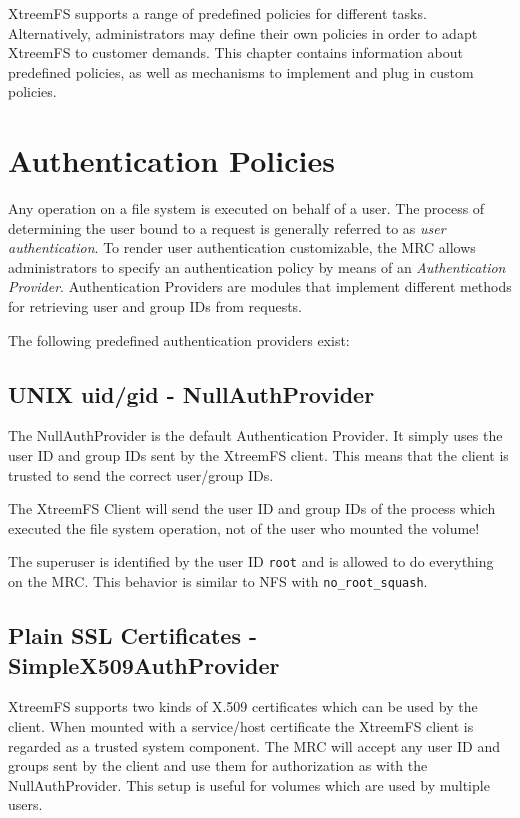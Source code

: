 \documentclass[a4paper,10pt]{book}
\begin{document}
XtreemFS supports a range of predefined policies for different tasks. Alternatively, administrators may define their own policies in order to adapt XtreemFS to customer demands. This chapter contains information about predefined policies, as well as mechanisms to implement and plug in custom policies.

\section{Authentication Policies} \label{sec:authentication_policies}
Any operation on a file system is executed on behalf of a user. The process of determining the user bound to a request is generally referred to as \emph{user authentication}. To render user authentication customizable, the MRC allows administrators to specify an authentication policy by means of an \emph{Authentication Provider}. Authentication Providers are modules that implement different methods for retrieving user and group IDs from requests.

The following predefined authentication providers exist:

\subsection{UNIX uid/gid - NullAuthProvider}

The NullAuthProvider is the default Authentication Provider. It simply uses the user ID and group IDs sent by the XtreemFS client. This means that the client is trusted to send the correct user/group IDs.

The XtreemFS Client will send the user ID and group IDs of the process which executed the file system operation, not of the user who mounted the volume!

The superuser is identified by the user ID \texttt{root} and is allowed to do everything on the MRC. This behavior is similar to NFS with \texttt{no\_root\_squash}.

\subsection{Plain SSL Certificates - SimpleX509AuthProvider}

XtreemFS supports two kinds of X.509 certificates which can be used by the client. When mounted with a service/host certificate the XtreemFS client is regarded as a trusted system component. The MRC will accept any user ID and groups sent by the client and use them for authorization as with the NullAuthProvider. This setup is useful for volumes which are used by multiple users.
\end{document}
